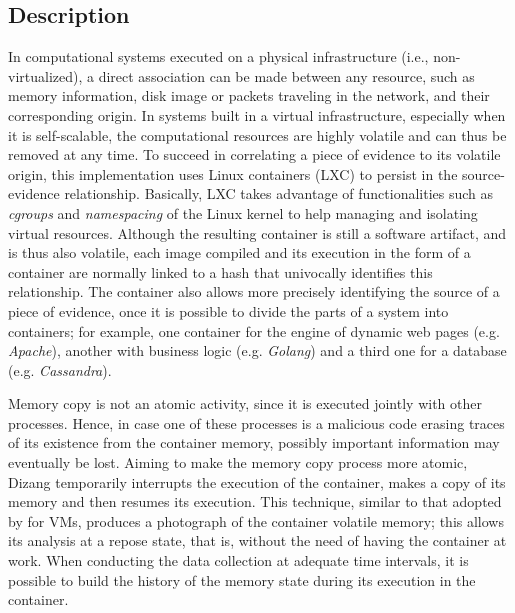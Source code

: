 \documentclass[conference]{IEEEtran}
\newcommand{\fancyname}{Dizang }
\begin{document}
\subsection{Description}
\label{sec:proposal-desc}

In computational systems executed on a physical infrastructure (i.e., non-virtualized), a direct association can be made between any resource, such as memory information, disk image or packets traveling in the network, and their corresponding origin.
%
In systems built in a virtual infrastructure, especially when it is self-scalable, the computational resources are highly volatile and can thus be removed at any time.
%
To succeed in correlating a piece of evidence to its volatile origin, this implementation uses Linux containers (LXC) to persist in the source-evidence relationship.
%
Basically, LXC takes advantage of functionalities such as \textit{cgroups} and \textit{namespacing} of the Linux kernel to help managing and isolating virtual resources.
%
Although the resulting container is still a software artifact, and is thus also volatile, each image compiled and its execution in the form of a container are normally linked to a hash that univocally identifies this relationship.
%
The container also allows more precisely identifying the source of a piece of evidence, once it is possible to divide the parts of a system into containers; for example, one container for the engine of dynamic web pages (e.g. \textit{Apache}), another with business logic (e.g. \textit{Golang}) and a third one for a database (e.g. \textit{Cassandra}).


Memory copy is not an atomic activity, since it is executed jointly with other processes.
%
Hence, in case one of these processes is a malicious code erasing traces of its existence from the container memory, possibly important information may eventually be lost. 
%
Aiming to make the memory copy process more atomic, \fancyname temporarily interrupts the execution of the container, makes a copy of its memory and then resumes its execution. 
%
This technique, similar to that adopted by \cite{Rafique_Static_Live_Digital_Forensics:2013} for VMs, produces a photograph of the container volatile memory; this allows its analysis at a repose state, that is, without the need of having the container at work.
%
When conducting the data collection at adequate time intervals, it is possible to build the history of the memory state during its execution in the container.
%
\end{document}
